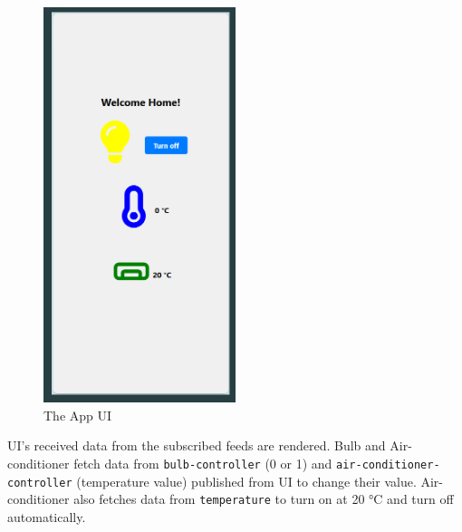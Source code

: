 \begin{figure}[ht]
  \centering
  \includegraphics[width=0.5\textwidth]{img/app-ui.png}
  \vspace{0.5cm}
  \caption{The App UI}
\end{figure}

UI's received data from the subscribed feeds are rendered. Bulb and Air-conditioner fetch data from \texttt{bulb-controller} (0 or 1) and \texttt{air-conditioner-controller} (temperature value) published from UI to change their value. Air-conditioner also fetches data from \texttt{temperature} to turn on at 20 °C and turn off automatically.